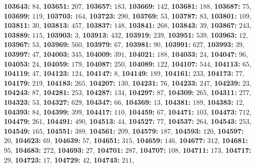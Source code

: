 \textsf{\bfseries 103643:} $84$, \textsf{\bfseries 103651:} $207$, \textsf{\bfseries 103657:} $183$, \textsf{\bfseries 103669:} $142$, \textsf{\bfseries 103681:} $188$, \textsf{\bfseries 103687:} $75$, \textsf{\bfseries 103699:} $119$, \textsf{\bfseries 103703:} $164$, \textsf{\bfseries 103723:} $290$, \textsf{\bfseries 103769:} $53$, \textsf{\bfseries 103787:} $83$, \textsf{\bfseries 103801:} $109$, \textsf{\bfseries 103811:} $30$, \textsf{\bfseries 103813:} $457$, \textsf{\bfseries 103837:} $148$, \textsf{\bfseries 103841:} $268$, \textsf{\bfseries 103843:} $39$, \textsf{\bfseries 103867:} $243$, \textsf{\bfseries 103889:} $115$, 
\textsf{\bfseries 103903:} $3$, \textsf{\bfseries 103913:} $432$, \textsf{\bfseries 103919:} $239$, \textsf{\bfseries 103951:} $539$, \textsf{\bfseries 103963:} $12$, \textsf{\bfseries 103967:} $53$, \textsf{\bfseries 103969:} $560$, \textsf{\bfseries 103979:} $67$, \textsf{\bfseries 103981:} $90$, \textsf{\bfseries 103991:} $627$, \textsf{\bfseries 103993:} $39$, \textsf{\bfseries 103997:} $47$, \textsf{\bfseries 104003:} $345$, \textsf{\bfseries 104009:} $391$, \textsf{\bfseries 104021:} $188$, \textsf{\bfseries 104033:} $24$, \textsf{\bfseries 104047:} $96$, \textsf{\bfseries 104053:} $24$, \textsf{\bfseries 104059:} $179$, \textsf{\bfseries 104087:} $250$, \textsf{\bfseries 104089:} $122$, \textsf{\bfseries 104107:} $544$, \textsf{\bfseries 104113:} $65$, \textsf{\bfseries 104119:} $47$, \textsf{\bfseries 104123:} $124$, \textsf{\bfseries 104147:} $8$, \textsf{\bfseries 104149:} $189$, \textsf{\bfseries 104161:} $233$, \textsf{\bfseries 104173:} $77$, \textsf{\bfseries 104179:} $219$, \textsf{\bfseries 104183:} $265$, \textsf{\bfseries 104207:} $130$, \textsf{\bfseries 104231:} $76$, \textsf{\bfseries 104233:} $247$, \textsf{\bfseries 104239:} $23$, \textsf{\bfseries 104243:} $87$, \textsf{\bfseries 104281:} $253$, \textsf{\bfseries 104287:} $134$, \textsf{\bfseries 104297:} $87$, \textsf{\bfseries 104309:} $265$, \textsf{\bfseries 104311:} $277$, \textsf{\bfseries 104323:} $53$, \textsf{\bfseries 104327:} $629$, \textsf{\bfseries 104347:} $66$, \textsf{\bfseries 104369:} $13$, \textsf{\bfseries 104381:} $189$, \textsf{\bfseries 104383:} $12$, \textsf{\bfseries 104393:} $84$, \textsf{\bfseries 104399:} $399$, \textsf{\bfseries 104417:} $110$, \textsf{\bfseries 104459:} $67$, \textsf{\bfseries 104471:} $103$, \textsf{\bfseries 104473:} $712$, \textsf{\bfseries 104479:} $261$, \textsf{\bfseries 104491:} $490$, \textsf{\bfseries 104513:} $44$, \textsf{\bfseries 104527:} $77$, \textsf{\bfseries 104537:} $264$, \textsf{\bfseries 104543:} $253$, \textsf{\bfseries 104549:} $165$, \textsf{\bfseries 104551:} $389$, \textsf{\bfseries 104561:} $209$, \textsf{\bfseries 104579:} $187$, \textsf{\bfseries 104593:} $120$, \textsf{\bfseries 104597:} $20$, \textsf{\bfseries 104623:} $69$, \textsf{\bfseries 104639:} $57$, \textsf{\bfseries 104651:} $315$, \textsf{\bfseries 104659:} $146$, \textsf{\bfseries 104677:} $312$, \textsf{\bfseries 104681:} $95$, \textsf{\bfseries 104683:} $272$, \textsf{\bfseries 104693:} $27$, \textsf{\bfseries 104701:} $287$, \textsf{\bfseries 104707:} $108$, \textsf{\bfseries 104711:} $173$, \textsf{\bfseries 104717:} $29$, \textsf{\bfseries 104723:} $17$, \textsf{\bfseries 104729:} $42$, \textsf{\bfseries 104743:} $211$, 